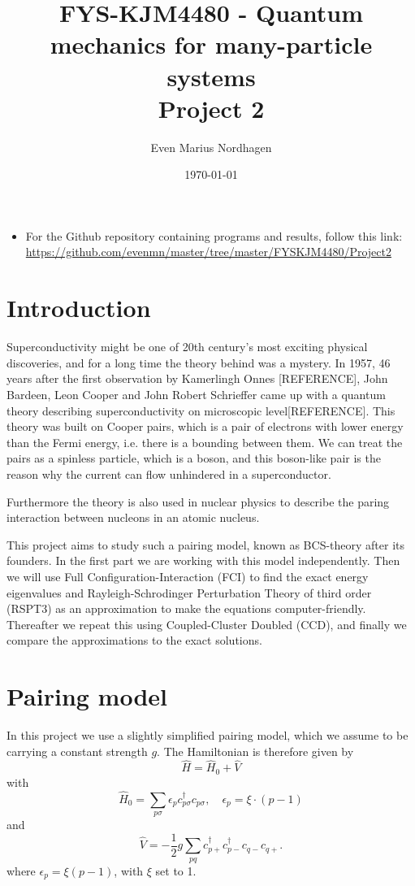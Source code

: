 \documentclass[norsk,a4paper,12pt]{article}
\title{FYS-KJM4480 - Quantum mechanics for many-particle systems \\\vspace{2mm} \Large{Project 2}}
\author{\large Even Marius Nordhagen}
\date\today
\begin{document}
\maketitle

\begin{itemize}
\item For the Github repository containing programs and results, follow this link: 
\url{https://github.com/evenmn/master/tree/master/FYSKJM4480/Project2}
\end{itemize}

\section*{Introduction}
Superconductivity might be one of 20th century's most exciting physical discoveries, and for a long time the theory behind was a mystery. In 1957, 46 years after the first observation by Kamerlingh Onnes [REFERENCE], John Bardeen, Leon Cooper and John Robert Schrieffer came up with a quantum theory describing superconductivity on microscopic level[REFERENCE]. This theory was built on Cooper pairs, which is a pair of electrons with lower energy than the Fermi energy, i.e. there is a bounding between them. We can treat the pairs as a spinless particle, which is a boson, and this boson-like pair is the reason why the current can flow unhindered in a superconductor. 

Furthermore the theory is also used in nuclear physics to describe the paring interaction between nucleons in an atomic nucleus. 

This project aims to study such a pairing model, known as BCS-theory after its founders. In the first part we are working with this model independently. Then we will use Full Configuration-Interaction (FCI) to find the exact energy eigenvalues and Rayleigh-Schrodinger Perturbation Theory of third order (RSPT3) as an approximation to make the equations computer-friendly. Thereafter we repeat this using Coupled-Cluster Doubled (CCD), and finally we compare the approximations to the exact solutions.
\newpage

\section{Pairing model}
In this project we use a slightly simplified pairing model, which we assume to be carrying a constant strength $g$. The Hamiltonian is therefore given by
\begin{equation}
\hat{H}=\hat{H}_0+\hat{V}
\end{equation}
with
\begin{equation}
\hat{H}_0=\sum_{p\sigma}\epsilon_pc_{p\sigma}^{\dagger}c_{p\sigma},\quad \epsilon_p=\xi\cdot(p-1)
\label{eq:H0_init}
\end{equation}
and
\begin{equation}
\hat{V}=-\frac{1}{2}g\sum_{pq}c_{p+}^{\dagger}c_{p-}^{\dagger}c_{q-}c_{q+}.
\label{eq:V_init}
\end{equation}
where $\epsilon_p=\xi(p-1)$, with $\xi$ set to 1.
\end{document}

